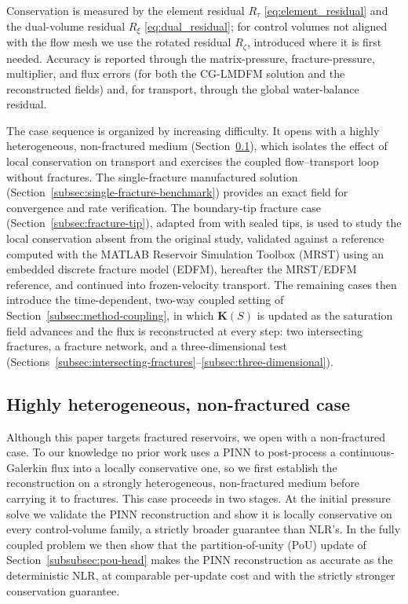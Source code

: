 \documentclass[a4paper,fleqn]{cas-sc}
\newcommand{\Kmat}{\mathbf{K}}
\begin{document}
Conservation is measured by the element residual \(R_\tau\)
\eqref{eq:element_residual} and the dual-volume residual \(R_\xi\)
\eqref{eq:dual_residual}; for control volumes not aligned with the flow mesh we
use the rotated residual \(R_\zeta\), introduced where it is first needed.
Accuracy is reported through the matrix-pressure, fracture-pressure, multiplier,
and flux errors (for both the CG-LMDFM solution and the reconstructed fields)
and, for transport, through the global water-balance residual.

The case sequence is organized by increasing difficulty. It opens with a
highly heterogeneous, non-fractured medium
(Section~\ref{subsec:heterogeneous-nonfractured}), which isolates the effect of
local conservation on transport and exercises the coupled flow--transport loop
without fractures. The single-fracture manufactured solution
(Section~\ref{subsec:single-fracture-benchmark}) provides an exact field for
convergence and rate verification. The boundary-tip fracture case
(Section~\ref{subsec:fracture-tip}), adapted from \citet{Koeppel2019} with sealed
tips, is used to study the local conservation absent from the original study,
validated against
a reference computed with the MATLAB Reservoir Simulation
Toolbox (MRST) using an embedded discrete fracture model (EDFM), hereafter the
MRST/EDFM reference, and continued into frozen-velocity transport.
The remaining cases then introduce the time-dependent, two-way coupled setting of
Section~\ref{subsec:method-coupling}, in which \(\Kmat(S)\) is updated as the
saturation field advances and the flux is reconstructed at every step: two
intersecting fractures, a fracture network, and a three-dimensional test
(Sections~\ref{subsec:intersecting-fractures}--\ref{subsec:three-dimensional}).

\subsection{Highly heterogeneous, non-fractured case}
\label{subsec:heterogeneous-nonfractured}

Although this paper targets fractured reservoirs, we open with a non-fractured
case. To our knowledge no prior work uses a PINN to post-process a
continuous-Galerkin flux into a locally conservative one, so we first establish
the reconstruction on a strongly heterogeneous, non-fractured medium before
carrying it to fractures. This case proceeds in two
stages. At the initial pressure solve we validate the PINN reconstruction and
show it is locally conservative on every control-volume family, a strictly broader
guarantee than NLR's. In the fully coupled problem we then show that the
partition-of-unity (PoU) update of Section~\ref{subsubsec:pou-head} makes the
PINN reconstruction as accurate as the deterministic NLR, at comparable per-update
cost and with the strictly stronger conservation guarantee.
\end{document}
